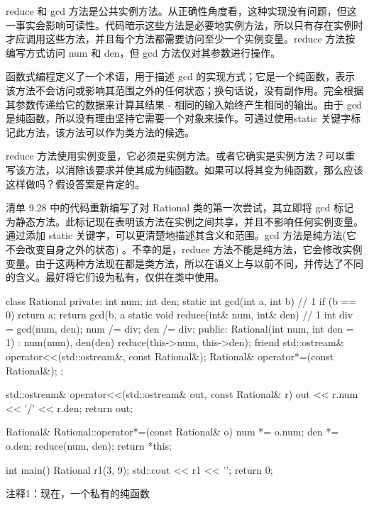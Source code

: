 reduce 和 gcd 方法是公共实例方法。从正确性角度看，这种实现没有问题，但这一事实会影响可读性。代码暗示这些方法是必要地实例方法，所以只有存在实例时才应调用这些方法，并且每个方法都需要访问至少一个实例变量。reduce 方法按编写方式访问 num 和 den，但 gcd 方法仅对其参数进行操作。

函数式编程定义了一个术语，用于描述 gcd 的实现方式；它是一个纯函数，表示该方法不会访问或影响其范围之外的任何状态；换句话说，没有副作用。完全根据其参数传递给它的数据来计算其结果 - 相同的输入始终产生相同的输出。由于 gcd 是纯函数，所以没有理由坚持它需要一个对象来操作。可通过使用static 关键字标记此方法，该方法可以作为类方法的候选。

reduce 方法使用实例变量，它必须是实例方法。或者它确实是实例方法？可以重写该方法，以消除该要求并使其成为纯函数。如果可以将其变为纯函数，那么应该这样做吗？假设答案是肯定的。


清单 9.28 中的代码重新编写了对 Rational 类的第一次尝试，其立即将 gcd 标记为静态方法。此标记现在表明该方法在实例之间共享，并且不影响任何实例变量。通过添加 static 关键字，可以更清楚地描述其含义和范围。gcd 方法是纯方法(它不会改变自身之外的状态) 。不幸的是，reduce 方法不能是纯方法，它会修改实例变量。由于这两种方法现在都是类方法，所以在语义上与以前不同，并传达了不同的含义。最好将它们设为私有，仅供在类中使用。


\begin{cpp}
class Rational {
  private:
  int num;
  int den;
  static int gcd(int a, int b) { // 1
    if (b == 0)
      return a;
    return gcd(b, a %
  }
  static void reduce(int& num, int& den) { // 1
    int div = gcd(num, den);
    num /= div;
    den /= div;
  }
public:
  Rational(int num, int den = 1) : num(num), den(den) {
    reduce(this->num, this->den); }
  friend std::ostream& operator<<(std::ostream&, const Rational&);
  Rational& operator*=(const Rational&);
};

std::ostream& operator<<(std::ostream& out, const Rational& r) {
  out << r.num << '/' << r.den;
  return out;
}

Rational& Rational::operator*=(const Rational& o) {
  num *= o.num;
  den *= o.den;
  reduce(num, den);
  return *this;
}

int main() {
  Rational r1(3, 9);
  std::cout << r1 << '\n';
  return 0;
}
\end{cpp}

{\footnotesize
注释1：现在，一个私有的纯函数
}

